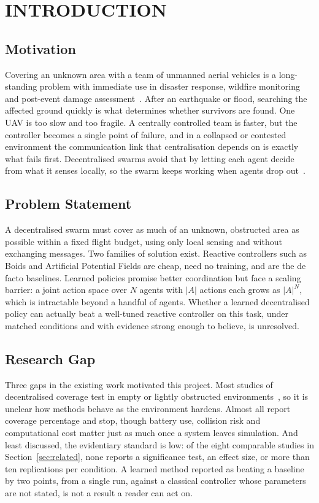 \documentclass[a4paper, 10pt, conference]{ieeeconf}
\begin{document}
\section{INTRODUCTION}\label{sec:intro}

\subsection{Motivation}

Covering an unknown area with a team of unmanned aerial vehicles is a
long-standing problem with immediate use in disaster response,
wildfire monitoring and post-event damage assessment~\cite{erdelj2017}.
After an earthquake or flood, searching the affected ground quickly is
what determines whether survivors are found. One UAV is too slow and
too fragile. A centrally controlled team is faster, but the controller
becomes a single point of failure, and in a collapsed or contested
environment the communication link that centralisation depends on is
exactly what fails first. Decentralised swarms avoid that by letting
each agent decide from what it senses locally, so the swarm keeps
working when agents drop out~\cite{dorigo2021}.

\subsection{Problem Statement}

A decentralised swarm must cover as much of an unknown, obstructed
area as possible within a fixed flight budget, using only local
sensing and without exchanging messages. Two families of
solution exist. Reactive controllers such as Boids and Artificial
Potential Fields are cheap, need no training, and are the de facto
baselines. Learned policies promise better coordination but face a
scaling barrier: a joint action space over $N$ agents with $|A|$
actions each grows as $|A|^N$, which is intractable beyond a handful
of agents. Whether a learned decentralised policy can actually beat a
well-tuned reactive controller on this task, under matched conditions
and with evidence strong enough to believe, is unresolved.

\subsection{Research Gap}

Three gaps in the existing work motivated this project. Most studies
of decentralised coverage test in empty or lightly obstructed
environments~\cite{zhu2023}, so it is unclear how methods behave as
the environment hardens. Almost all report coverage percentage and
stop, though battery use, collision risk and computational cost matter
just as much once a system leaves simulation. And least discussed, the
evidentiary standard is low: of the eight comparable studies in
Section~\ref{sec:related}, none reports a significance test, an effect
size, or more than ten replications per condition. A learned method
reported as beating a baseline by two points, from a single run,
against a classical controller whose parameters are not stated, is not
a result a reader can act on.
\end{document}
